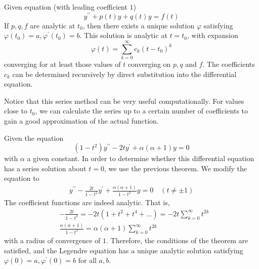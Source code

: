 \documentclass{article}
\newcounter{theorem}[section]
\newcounter{example}[section]
\begin{document}
    \begin{theorem}
      \label{thm:existence-of-analytic-solutions-of-2nd-order}
    Given equation (with leading coefficient $1$)
    \begin{equation}
      y^{\prime\prime} + p(t) y + q(t) y = f(t)
    \end{equation}
    If $p, q, f$ are analytic at $t_0$, then there exists a unique solution $\varphi$ satisfying $\varphi (t_0) = a, \varphi^\prime (t_0) = b$. This solution is analytic at $t = t_0$, with expansion
    \begin{equation}
      \varphi(t) = \sum_{k=0}^\infty c_k (t-t_0)^k
    \end{equation}
    converging for at least those values of $t$ converging on $p, q$ and $f$. The coefficients $c_k$ can be determined recursively by direct substitution into the differential equation. 
    \end{theorem}

    Notice that this series method can be very useful computationally. For values close to $t_0$, we can calculate the series up to a certain number of coefficients to gain a good approximation of the actual function. 

    \begin{example}
      \label{ex:legendre-equation}
    Given the equation
    \begin{equation}
      (1 - t^2) y^{\prime \prime} - 2 t y^\prime + \alpha (\alpha + 1) y = 0
    \end{equation}
    with $\alpha$ a given constant. In order to determine whether this differential equation has a series solution about $t=0$, we use the previous theorem. We modify the equation to
    \begin{align*}
        y^{\prime\prime} - \frac{2 t}{1 - t^2} y^\prime + \frac{\alpha (\alpha + 1)}{1 - t^2} y = 0 \quad (t \neq \pm 1) 
    \end{align*}
    The coefficient functions are indeed analytic. That is, 
    \begin{align*}
        & - \frac{2t}{1 - t^2} = -2 t (1 + t^2 + t^4 + ... ) = -2t \sum_{k=0}^\infty t^{2k} \\
        & \frac{\alpha(\alpha+1)}{1 - t^2} = \alpha (\alpha + 1) \sum_{k=0}^\infty t^{2k}
    \end{align*}
    with a radius of convergence of $1$. Therefore, the conditions of the theorem are satisfied, and the Legendre equation has a unique analytic solution satisfying $\varphi(0) = a, \varphi^\prime (0) = b$ for all $a, b$. 
    \end{example}
\end{document}
